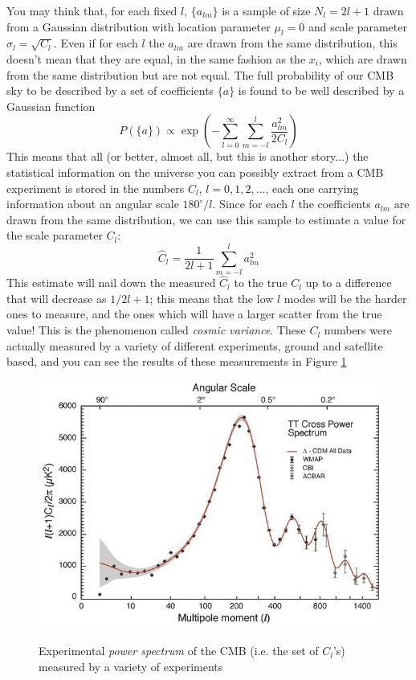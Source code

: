 You may think that, for each fixed $l$, $\{a_{lm}\}$ is a sample of size $N_l=2l+1$ drawn from a Gaussian distribution with location parameter $\mu_l=0$ and scale parameter $\sigma_l=\sqrt{C_l}$. Even if for each $l$ the $a_{lm}$ are drawn from the same distribution, this doesn't mean that they are equal, in the same fashion as the $x_i$, which are drawn from the same distribution but are not equal. The full probability of our CMB sky to be described by a set of coefficients $\{a\}$ is found to be well described by a Gaussian function
\begin{equation}
P(\{a\})\propto \exp{\left(-\sum_{l=0}^\infty\sum_{m=-l}^l\frac{a_{lm}^2}{2C_l}\right)}
\end{equation}
This means that all (or better, almost all, but this is another story...) the statistical information on the universe you can possibly extract from a CMB experiment is stored in the numbers $C_l$, $l=0,1,2,...$, each one carrying information about an angular scale $180^\circ/l$. Since for each $l$ the coefficients $a_{lm}$ are drawn from the same distribution, we can use this sample to estimate a value for the scale parameter $C_l$:
\begin{equation}
\hat{C}_l=\frac{1}{2l+1}\sum_{m=-l}^la^2_{lm}
\end{equation} 
%
This estimate will nail down the measured $\hat{C}_l$ to the true $C_l$ up to a difference that will decrease as $1/2l+1$; this means that the low $l$ modes will be the harder ones to measure, and the ones which will have a larger scatter from the true value! This is the phenomenon called \textit{cosmic variance}. These $C_l$ numbers were actually measured by a variety of different experiments, ground and satellite based, and you can see the results of these measurements in Figure \ref{exppower}
\begin{figure}
\begin{center}
\includegraphics[scale=0.7]{CMB/exp_power}
\label{}
\end{center}
\caption{Experimental \textit{power spectrum} of the CMB (i.e. the set of $C_l$'s) measured by a variety of experiments}
\label{exppower}
\end{figure}
